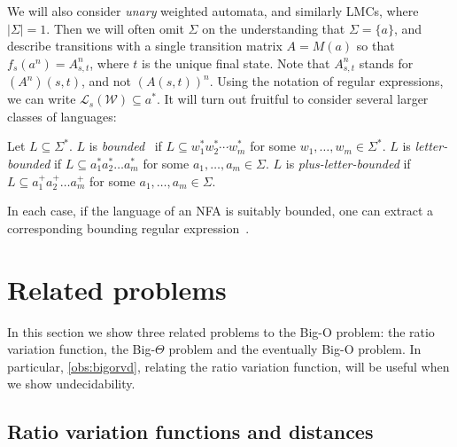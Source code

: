 \documentclass[10pt,a4paper]{amsart}
\numberwithin{equation}{section}
\theoremstyle{plain}
\theoremstyle{definition}
\theoremstyle{remark}
\newcommand\lng[2]{\mathcal{L}_{#1}(#2)}
\newcommand\chr{a}
\newcommand\wa{\mathcal{W}}
\renewcommand\nu{f}
\begin{document}
We will also consider \textit{unary} weighted automata, and similarly LMCs, where $|\Sigma|=1$. Then we will often omit  $\Sigma$
on the understanding that $\Sigma=\{a\}$, and describe  transitions with a single transition matrix $A=M(a)$ so that $\nu_s(a^n) = A_{s,t}^n$, where $t$ is the unique final state. Note that $A^n_{s,t}$ stands for $(A^n)(s,t)$,
and not $(A(s,t))^n$. Using the notation of regular expressions, we can write $\lng{s}{\wa}\subseteq a^\ast$.  It will turn out fruitful to consider several larger classes of languages:

\begin{defi}\label{def:bounded}  \label{def:letter-bounded} \label{def:plus-letter-bounded}\begin{sloppypar}
Let $L\subseteq \Sigma^\ast$.
$L$ is \emph{bounded}~\cite{ginsburg1964bounded} if $L\subseteq w_1^\ast w_2^\ast \cdots w_m^\ast$
for some $w_1, \dots, w_m \in \Sigma^*$.
$L$ is \emph{letter-bounded} if $L\subseteq \chr_1^*\chr_2^*\dots \chr_m^*$ for some
$\chr_1,\dots,\chr_m\in \Sigma$.
$L$ is \emph{plus-letter-bounded} if $L\subseteq\chr_1^+\chr_2^+\dots \chr_m^+$ for some
$\chr_1,\dots,\chr_m\in \Sigma$.\end{sloppypar}
\end{defi}
In each case, if the language of an NFA is suitably bounded, one can extract a corresponding bounding  regular expression~\cite{GawrychowskiKRS10}.

\section{Related problems}

\label{sec:bigord}

In this section we show three related problems to the Big-O problem: the ratio variation function, the Big-$\Theta$ problem and the eventually Big-O problem. In particular, \cref{obs:bigorvd}, relating the ratio variation function, will be useful when we show undecidability.

\subsection{Ratio variation functions and distances}
\end{document}
